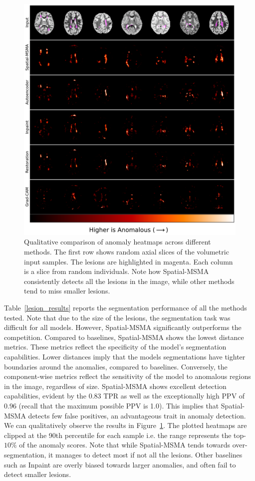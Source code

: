 \begin{figure}[!tbhp]
\centering
\includegraphics[width=1.01\textwidth, height=1.05\textwidth]{figures/lesion_heatmaps-l.pdf}
\caption{Qualitative comparison of anomaly heatmaps across different methods. The first row shows random axial slices of the volumetric input samples. The lesions are highlighted in magenta. Each column is a slice from random individuals. Note how Spatial-MSMA consistently detects all the lesions in the image, while other methods tend to miss smaller lesions.}
\label{fig:lesion-comp}
\end{figure}


Table~\ref{lesion_results} reports the segmentation performance of all the methods tested. Note that due to the size of the lesions, the segmentation task was difficult for all models. However, Spatial-MSMA significantly outperforms the competition. Compared to baselines, Spatial-MSMA shows the lowest distance metrics. These metrics reflect the specificity of the model's segmentation capabilities. Lower distances imply that the models segmentations have tighter boundaries around the anomalies, compared to baselines. Conversely, the component-wise metrics reflect the sensitivity of the model to anomalous regions in the image, regardless of size. Spatial-MSMA shows excellent detection capabilities, evident by the $0.83$ TPR as well as the exceptionally high PPV of $0.96$ (recall that the maximum possible PPV is 1.0). This implies that Spatial-MSMA detects few false positives, an advantageous trait in anomaly detection. We can qualitatively observe the results in Figure~\ref{fig:lesion-comp}. The plotted heatmaps are clipped at the 90th percentile for each sample i.e. the range represents the top-$10\%$ of the anomaly scores. Note that while Spatial-MSMA tends towards over-segmentation, it manages to detect most if not all the lesions. Other baselines such as Inpaint are overly biased towards larger anomalies, and often fail to detect smaller lesions.

